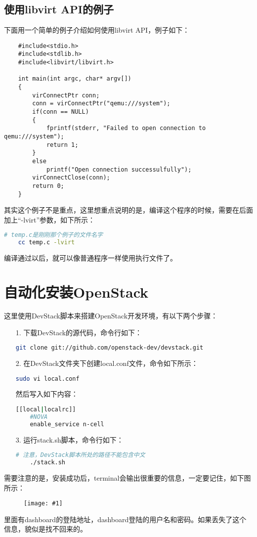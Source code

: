 \documentclass[a4paper,left=2.5cm,right=2.5cm,11pt]{article}
\newcommand{\fic}[1]{\begin{figure}[H]
		\center
		\texttt{[image: \#1]}
	\end{figure}}
\begin{document}
\subsection{使用libvirt API的例子}
	下面用一个简单的例子介绍如何使用libvirt API，例子如下：
	\begin{lstlisting}
	#include<stdio.h>
	#include<stdlib.h>
	#include<libvirt/libvirt.h>

	int main(int argc, char* argv[])
	{
		virConnectPtr conn;
		conn = virConnectPtr("qemu:///system");
		if(conn == NULL)
		{
			fprintf(stderr, "Failed to open connection to qemu:///system");
			return 1;
		}
		else
			printf("Open connection successulfully");
		virConnectClose(conn);
		return 0;
	}
	\end{lstlisting}

	其实这个例子不是重点，这里想重点说明的是，编译这个程序的时候，需要在后面加上“-lvirt”参数，如下所示：
	\begin{lstlisting}[language = bash]
	# temp.c是刚刚那个例子的文件名字
	cc temp.c -lvirt
	\end{lstlisting}

	编译通过以后，就可以像普通程序一样使用执行文件了。

\clearpage

\section{自动化安装OpenStack}
	这里使用DevStack脚本来搭建OpenStack开发环境，有以下两个步骤：
	\begin{itemize}
		\item[1.] 下载DevStack的源代码，命令行如下：
		\begin{lstlisting}[language = bash]
	git clone git://github.com/openstack-dev/devstack.git
		\end{lstlisting}

		\item[2.] 在DevStack文件夹下创建local.conf文件，命令如下所示：
	\begin{lstlisting}[language = bash]
	sudo vi local.conf
	\end{lstlisting}

		然后写入如下内容：
		\begin{lstlisting}[language = bash]
	[[local|localrc]]
	#NOVA
	enable_service n-cell
		\end{lstlisting}

		\item[3.] 运行stack.sh脚本，命令行如下：
		\begin{lstlisting}[language = bash]
	# 注意，DevStack脚本所处的路径不能包含中文
	./stack.sh
		\end{lstlisting}
	\end{itemize}

	需要注意的是，安装成功后，terminal会输出很重要的信息，一定要记住，如下图所示：
	\fic{7.png}

	里面有dashboard的登陆地址，dashboard登陆的用户名和密码。如果丢失了这个信息，貌似是找不回来的。
\end{document}

